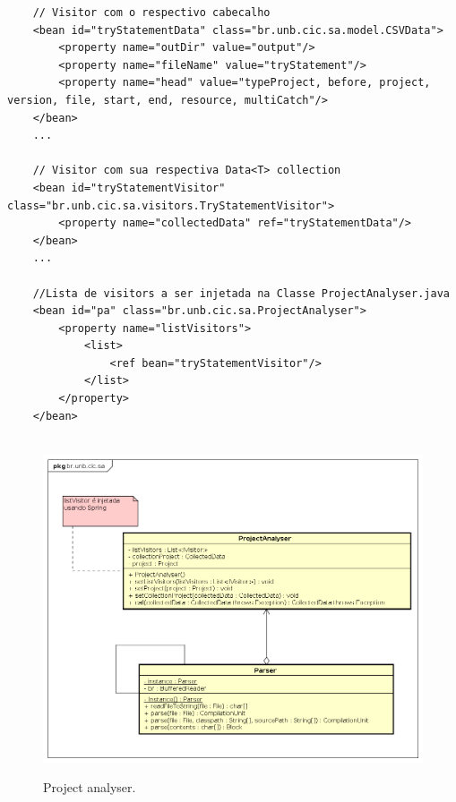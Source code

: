 \begin{lstlisting}
	// Visitor com o respectivo cabecalho 
	<bean id="tryStatementData" class="br.unb.cic.sa.model.CSVData">
		<property name="outDir" value="output"/>
		<property name="fileName" value="tryStatement"/>
		<property name="head" value="typeProject, before, project, version, file, start, end, resource, multiCatch"/> 
	</bean>
	...
	
	// Visitor com sua respectiva Data<T> collection
	<bean id="tryStatementVisitor" class="br.unb.cic.sa.visitors.TryStatementVisitor">
		<property name="collectedData" ref="tryStatementData"/>
	</bean>
	...
	
	//Lista de visitors a ser injetada na Classe ProjectAnalyser.java
	<bean id="pa" class="br.unb.cic.sa.ProjectAnalyser">
		<property name="listVisitors">
		 	<list>	
		 		<ref bean="tryStatementVisitor"/> 
		 	</list>
		</property>
	</bean>
		
\end{lstlisting}


\begin{figure}[h]
	\center
	\includegraphics[scale=0.4]{Imagens/ProjectAnalyser}
	\label{fig:ProjectAnalyser}
	\caption{Project analyser.}
\end{figure}


